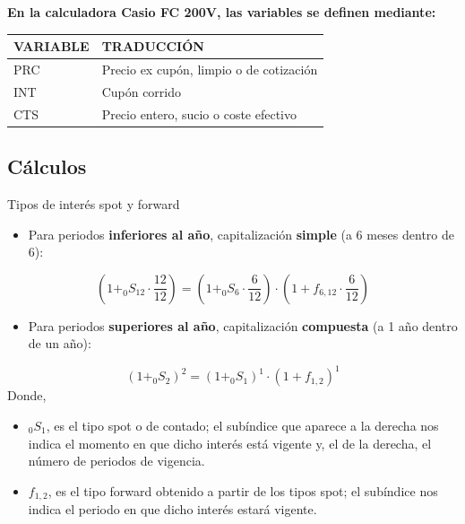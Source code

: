 \documentclass[
  letterpaper,
  DIV=11,
  numbers=noendperiod]{scrreprt}
\providecommand{\tightlist}{%
  \setlength{\itemsep}{0pt}\setlength{\parskip}{0pt}}\usepackage{longtable,booktabs,array}
\begin{document}
\begin{tcolorbox}
\textbf{En la calculadora Casio FC 200V, las variables se definen
mediante:}

\begin{longtable}[]{@{}ll@{}}
\toprule\noalign{}
\textbf{VARIABLE} & \textbf{TRADUCCIÓN} \\
\midrule\noalign{}
\endhead
\bottomrule\noalign{}
\endlastfoot
PRC & Precio ex cupón, limpio o de cotización \\
INT & Cupón corrido \\
CTS & Precio entero, sucio o coste efectivo \\
\end{longtable}

\subsection{Cálculos}\label{cuxe1lculos-1}

\begin{tcolorbox}[enhanced jigsaw, toprule=.15mm, left=2mm, arc=.35mm, breakable, bottomrule=.15mm, opacityback=0, rightrule=.15mm, leftrule=.75mm, colframe=quarto-callout-note-color-frame, colback=white]
\begin{minipage}[t]{5.5mm}
\textcolor{quarto-callout-note-color}{\faInfo}
\end{minipage}%
\begin{minipage}[t]{\textwidth - 5.5mm}

Tipos de interés spot y forward

\begin{itemize}
\tightlist
\item
  Para periodos \textbf{inferiores al año}, capitalización
  \textbf{simple} (a 6 meses dentro de 6):
\end{itemize}

\[(1+_{0}S_{12} \cdot \frac{12 }{12 })=(1+_{0}S_{6} \cdot \frac{6 }{12 })\cdot(1+f_{6,12}\cdot \frac{6 }{12 })\]

\begin{itemize}
\tightlist
\item
  Para periodos \textbf{superiores al año}, capitalización
  \textbf{compuesta} (a 1 año dentro de un año):
\end{itemize}

\[(1+_{0}S_{2})^{2}=(1+_{0}S_{1})^1\cdot(1+f_{1,2})^1\] Donde,

\begin{itemize}
\item
  \(_{0}S_{1}\), es el tipo spot o de contado; el subíndice que aparece
  a la derecha nos indica el momento en que dicho interés está vigente
  y, el de la derecha, el número de periodos de vigencia.
\item
  \(f_{1,2}\), es el tipo forward obtenido a partir de los tipos spot;
  el subíndice nos indica el periodo en que dicho interés estará
  vigente.
\end{itemize}


\end{minipage}
\end{tcolorbox}
\end{tcolorbox}
\end{document}
